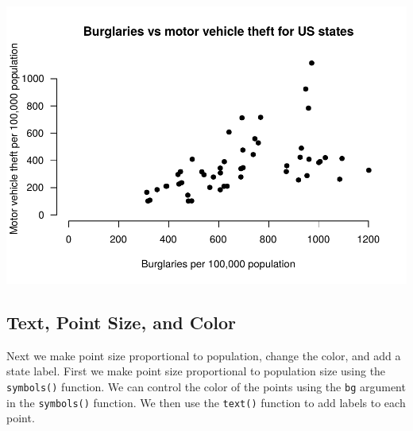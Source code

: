 \documentclass[
]{krantz}
\begin{document}
\includegraphics{bookdown_files/figure-latex/unnamed-chunk-347-1.pdf}

\hypertarget{text-point-size-and-color-1}{%
\subsection{Text, Point Size, and Color}\label{text-point-size-and-color-1}}

Next we make point size proportional to population, change the color, and add a state label. First we make point size proportional to population size using the \texttt{symbols()} function. We can control the color of the points using the \texttt{bg} argument in the \texttt{symbols()} function. We then use the \texttt{text()} function to add labels to each point.
\end{document}
